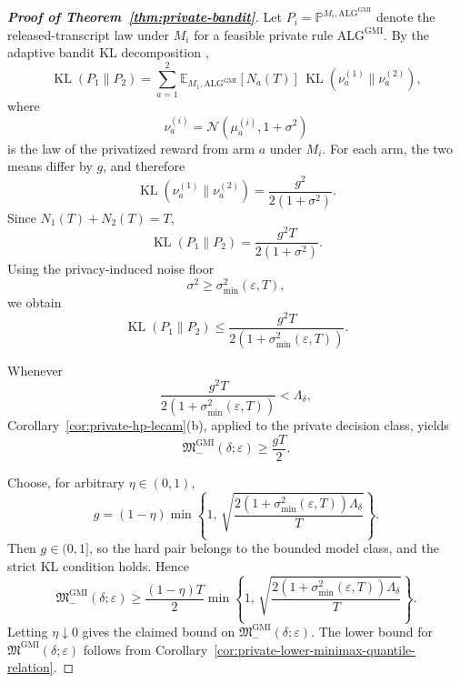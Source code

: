 \documentclass[journal]{IEEEtran}
\newcommand{\ALG}{\mathrm{ALG}}
\newcommand{\KL}{\operatorname{KL}}
\begin{document}
\begin{proof}[\textbf{Proof of Theorem~\ref{thm:private-bandit}}]
Let \(P_i=\mathbb P^{M_i,\ALG^{\mathrm{GMI}}}\) denote the released-transcript law under
\(M_i\) for a feasible private rule \(\ALG^{\mathrm{GMI}}\). By the adaptive bandit KL
decomposition \cite[Lemma 15.1]{lattimore2020bandit},
\[
\KL(P_1\|P_2)
=
\sum_{a=1}^2
\mathbb E_{M_1,\ALG^{\mathrm{GMI}}}[N_a(T)]\,
\KL(\nu_a^{(1)}\|\nu_a^{(2)}),
\]
where
\[
\nu_a^{(i)}
=
\mathcal N(\mu_a^{(i)},1+\sigma^2)
\]
is the law of the privatized reward from arm \(a\) under \(M_i\). For each arm,
the two means differ by \(g\), and therefore
\[
\KL(\nu_a^{(1)}\|\nu_a^{(2)})
=
\frac{g^2}{2(1+\sigma^2)}.
\]
Since \(N_1(T)+N_2(T)=T\),
\[
\KL(P_1\|P_2)
=
\frac{g^2T}{2(1+\sigma^2)}.
\]
Using the privacy-induced noise floor
\[
\sigma^2\ge\sigma_{\min}^2(\varepsilon,T),
\]
we obtain
\[
\KL(P_1\|P_2)
\le
\frac{g^2T}{2(1+\sigma_{\min}^2(\varepsilon,T))}.
\]

Whenever
\[
\frac{g^2T}{2(1+\sigma_{\min}^2(\varepsilon,T))}
<
\Lambda_\delta,
\]
Corollary~\ref{cor:private-hp-lecam}(b), applied to the private decision
class, yields
\[
\mathfrak M^{\mathrm{GMI}}_-(\delta;\varepsilon)\ge \frac{gT}{2}.
\]

Choose, for arbitrary \(\eta\in(0,1)\),
\[
g
=
(1-\eta)
\min\!\left\{
1,\,
\sqrt{
\frac{2(1+\sigma_{\min}^2(\varepsilon,T))\Lambda_\delta}{T}
}
\right\}.
\]
Then \(g\in(0,1]\), so the hard pair belongs to the bounded model class, and
the strict KL condition holds. Hence
\[
\mathfrak M^{\mathrm{GMI}}_-(\delta;\varepsilon)
\ge
\frac{(1-\eta)T}{2}
\min\!\left\{
1,\,
\sqrt{
\frac{2(1+\sigma_{\min}^2(\varepsilon,T))\Lambda_\delta}{T}
}
\right\}.
\]
Letting \(\eta\downarrow0\) gives the claimed bound on
\(\mathfrak M^{\mathrm{GMI}}_-(\delta;\varepsilon)\). The lower bound for
\(\mathfrak M^{\mathrm{GMI}}(\delta;\varepsilon)\) follows from
Corollary~\ref{cor:private-lower-minimax-quantile-relation}.
\end{proof}
\end{document}
